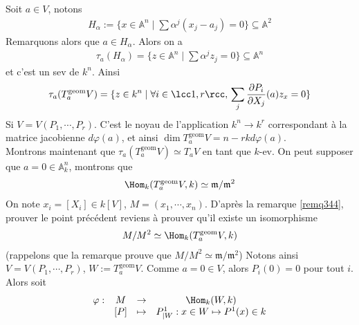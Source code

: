            Soit $a \in V$, notons
            \begin{align*}
                H_\alpha := \{x \in \mathbb{A}^n \mid \sum \alpha^j (x_j - a_j) = 0\} \subseteq \mathbb{A}^2
            \end{align*}
            Remarquons alors que $a \in H_\alpha$. Alors on a
            \begin{align*}
                \tau_a(H_\alpha) = \{z \in \mathbb{A}^n \mid \sum \alpha^jz_j = 0\} \subseteq \mathbb{A}^n
            \end{align*}
            et c'est un sev de $k^n$. Ainsi 
            \begin{align*}
                \tau_a(T_a^\mathrm{geom}V) = \{z \in k^n \mid \forall i \in \lcc 1,r \rcc,\, \sum_j \frac{\partial P_i}{\partial X_j}(a) z_x = 0\}
            \end{align*}
            Si $V = V(P_1, \cdots, P_r)$. C'est le noyau de l'application $k^n \to k^r$ correspondant à la matrice jacobienne $d \varphi(a)$, et ainsi $\dim T_a^\mathrm{geom}V = n - rk d \varphi(a)$. \\
            Montrons maintenant que $\tau_a(T_a^\mathrm{geom}V) \simeq T_aV$ en tant que $k$-ev. On peut supposer que $a = 0 \in \mathbb{A}^n_k$, montrons que 
            \begin{align*}
                \Hom_k(T_a^\mathrm{geom}V, k) \simeq \mathfrak{m}/\mathfrak{m}^2
            \end{align*}
            On note $x_i = [X_i] \in k[V]$, $M = (x_1, \cdots, x_n)$. D'après la remarque \ref{remq344}, prouver le point précédent reviens à prouver qu'il existe un isomorphisme
            \begin{align*}
                M/M^2 \simeq \Hom_k(T_a^\mathrm{geom}V, k) 
            \end{align*}
            (rappelons que la remarque prouve que $M/M^2 \simeq \mathfrak{m}/\mathfrak{m}^2$) Notons ainsi $V = V(P_1, \cdots, P_r)$, $W := T_a^\mathrm{geom}V$. Comme $a = 0 \in V$, alors $P_i(0) = 0$ pour tout $i$. Alors soit
            \begin{align*}
                \begin{array}{cccc}
                    \varphi : & M & \to & \Hom_k(W,k) \\
                    & [P] & \mapsto & P^1_{|W} : x \in W \mapsto P^1(x) \in k \\
                \end{array}
            \end{align*}
